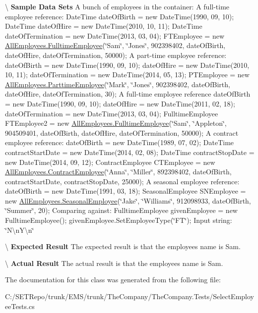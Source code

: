 \textbackslash{} {\bfseries  Sample Data Sets} A bunch of employees in the container\+: A full-\/time employee reference\+: Date\+Time date\+Of\+Birth = new Date\+Time(1990, 09, 10); Date\+Time date\+Of\+Hire = new Date\+Time(2010, 10, 11); Date\+Time date\+Of\+Termination = new Date\+Time(2013, 03, 04); F\+T\+Employee = new \hyperlink{class_all_employees_1_1_fulltime_employee}{All\+Employees.\+Fulltime\+Employee}(\char`\"{}\+Sam\char`\"{}, \char`\"{}\+Jones\char`\"{}, 902398402, date\+Of\+Birth, date\+Of\+Hire, date\+Of\+Termination, 50000); A part-\/time employee reference\+: date\+Of\+Birth = new Date\+Time(1990, 09, 10); date\+Of\+Hire = new Date\+Time(2010, 10, 11); date\+Of\+Termination = new Date\+Time(2014, 05, 13); P\+T\+Employee = new \hyperlink{class_all_employees_1_1_parttime_employee}{All\+Employees.\+Parttime\+Employee}(\char`\"{}\+Mark\char`\"{}, \char`\"{}\+Jones\char`\"{}, 902398402, date\+Of\+Birth, date\+Of\+Hire, date\+Of\+Termination, 30); A full-\/time employee reference date\+Of\+Birth = new Date\+Time(1990, 09, 10); date\+Of\+Hire = new Date\+Time(2011, 02, 18); date\+Of\+Termination = new Date\+Time(2013, 03, 04); Fulltime\+Employee F\+T\+Employee2 = new \hyperlink{class_all_employees_1_1_fulltime_employee}{All\+Employees.\+Fulltime\+Employee}(\char`\"{}\+Sam\char`\"{}, \char`\"{}\+Appleton\char`\"{}, 904509401, date\+Of\+Birth, date\+Of\+Hire, date\+Of\+Termination, 50000); A contract employee reference\+: date\+Of\+Birth = new Date\+Time(1989, 07, 02); Date\+Time contract\+Start\+Date = new Date\+Time(2014, 02, 08); Date\+Time contract\+Stop\+Date = new Date\+Time(2014, 09, 12); Contract\+Employee C\+T\+Employee = new \hyperlink{class_all_employees_1_1_contract_employee}{All\+Employees.\+Contract\+Employee}(\char`\"{}\+Anna\char`\"{}, \char`\"{}\+Miller\char`\"{}, 892398402, date\+Of\+Birth, contract\+Start\+Date, contract\+Stop\+Date, 25000); A seasonal employee reference\+: date\+Of\+Birth = new Date\+Time(1991, 03, 18); Seasonal\+Employee S\+N\+Employee = new \hyperlink{class_all_employees_1_1_seasonal_employee}{All\+Employees.\+Seasonal\+Employee}(\char`\"{}\+Jake\char`\"{}, \char`\"{}\+Williams\char`\"{}, 912098933, date\+Of\+Birth, \char`\"{}\+Summer\char`\"{}, 20); Comparing against\+: Fulltime\+Employee given\+Employee = new Fulltime\+Employee(); given\+Employee.\+Set\+Employee\+Type(\char`\"{}\+F\+T\char`\"{}); Input string\+: \char`\"{}\+N\textbackslash{}n\+Y\textbackslash{}n\char`\"{}

\textbackslash{} {\bfseries  Expected Result} The expected result is that the employee\textquotesingle{}s name is Sam.

\textbackslash{} {\bfseries  Actual Result} The actual result is that the employee\textquotesingle{}s name is Sam. 

The documentation for this class was generated from the following file\+:\begin{DoxyCompactItemize}
\item 
C\+:/\+S\+E\+T\+Repo/trunk/\+E\+M\+S/trunk/\+The\+Company/\+The\+Company.\+Tests/Select\+Employee\+Tests.\+cs\end{DoxyCompactItemize}
